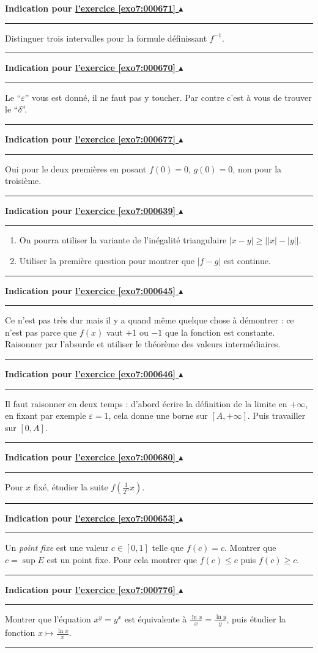 \documentclass[11pt,a4paper]{article}
\renewcommand{\epsilon}{\varepsilon}
\newcommand{\finexercice}{}
\newcommand{\noindication}{}
\newcounter{exo}
\newcommand{\indication}[1]{\hypertarget{ind7:#1}{}\label{ind7:#1}{\bf Indication pour \hyperlink{exo7:#1}{l'exercice \ref{exo7:#1} $\blacktriangle$}}\vspace{1mm}\hrule\vspace{1mm}}
\newcommand{\finindication}{\vspace{1mm}\hrule\vspace*{7mm}}
\newcommand{\finenonces}{\newpage}
\newcommand{\finindications}{\newpage}
\begin{document}
\finexercice
\finfiche

 \finenonces 



 \finindications 

\indication{000671}
Distinguer trois intervalles pour la formule définissant $f^{-1}$.
\finindication
\indication{000670}
Le ``$\epsilon$'' vous est donné, il ne faut pas y toucher.
Par contre c'est à vous de trouver le ``$\delta$''.
\finindication
\indication{000677}
Oui pour le deux premi\`eres en posant $f(0)=0$, $g(0)=0$, non pour la troisi\`eme.
\finindication
\indication{000639}
\begin{enumerate}
    \item On pourra utiliser la variante de l'in\'egalit\'e triangulaire $|x-y|\geq \big| |x|-|y| \big|$.
    \item Utiliser la premi\`ere question pour montrer que $|f-g|$ est continue.
\end{enumerate}
\finindication
\indication{000645}
Ce n'est pas tr\`es dur mais il y a quand m\^eme quelque chose \`a d\'emontrer :
ce n'est pas parce que $f(x)$ vaut $+1$ ou $-1$ que la fonction est constante.
Raisonner par l'absurde et utiliser le th\'eor\`eme des valeurs interm\'ediaires.
\finindication
\noindication
\indication{000646}
Il faut raisonner en deux temps : d'abord \'ecrire la d\'efinition de la limite en $+\infty$, en fixant par exemple $\epsilon =1$, cela donne une borne sur $[A,+\infty]$. Puis travailler sur $[0,A]$.
\finindication
\noindication
\indication{000680}
Pour $x$ fix\'e, \'etudier la suite $f(\frac 1{2^n} x)$.
\finindication
\indication{000653}
Un \emph{point fixe} est une valeur $c \in [0,1]$ telle que $f(c)=c$.
Montrer que $c = \sup E$ est un point fixe. 
Pour cela montrer que $f(c) \leqslant c$ puis $f(c) \geqslant c$.
\finindication
\indication{000776}
Montrer que l'\'equation $x^y=y^x$ est \'equivalente \`a $\frac{\ln x}{x}= \frac{\ln y}{y}$,
puis \'etudier la fonction $x \mapsto \frac{\ln x}{x}$.
\finindication


\newpage
\end{document}
